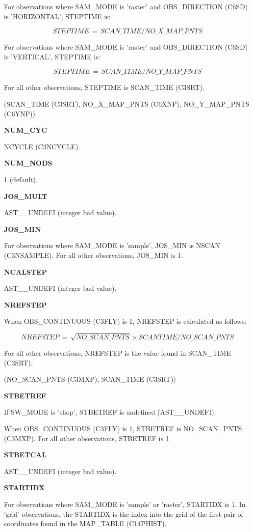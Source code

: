 \documentclass[twoside,11pt,nolof]{starlink}
\providecommand{\obsContinuous}{OBS\_CONTINUOUS (C3FLY)}
\providecommand{\nMapPtsX}{NO\_X\_MAP\_PNTS (C6XNP)}
\providecommand{\nMapPtsY}{NO\_Y\_MAP\_PNTS (C6YNP)}
\providecommand{\obsDirection}{OBS\_DIRECTION (C6SD)}
\providecommand{\nScan}{NSCAN (C3NSAMPLE)}
\providecommand{\scanTime}{SCAN\_TIME (C3SRT)}
\providecommand{\nScanPts}{NO\_SCAN\_PNTS (C3MXP)}
\providecommand{\nCycle}{NCYCLE (C3NCYCLE)}
\providecommand{\mapTable}{MAP\_TABLE (C14PHIST)}
\begin{document}
For observations where SAM\_MODE is 'raster' and \obsDirection{} is 'HORIZONTAL', STEPTIME is:

\begin{equation}
STEPTIME \,=\,SCAN\_TIME / NO\_X\_MAP\_PNTS
\end{equation}

For observations where SAM\_MODE is 'raster' and \obsDirection{} is 'VERTICAL', STEPTIME is:

\begin{equation}
STEPTIME \,=\, SCAN\_TIME / NO\_Y\_MAP\_PNTS
\end{equation}

For all other observations, STEPTIME is \scanTime{}.

(\scanTime, \nMapPtsX, \nMapPtsY)

\textbf{NUM\_CYC}

\nCycle.

\textbf{NUM\_NODS}

1 (default).

\textbf{JOS\_MULT}

AST\_\_UNDEFI (integer bad value).

\textbf{JOS\_MIN}

For observations where SAM\_MODE is 'sample', JOS\_MIN is \nScan.  For all other observations, JOS\_MIN is 1.

\textbf{NCALSTEP}

AST\_\_UNDEFI (integer bad value).

\textbf{NREFSTEP}

When \obsContinuous{} is 1, NREFSTEP is calculated as follows:

\begin{equation}
NREFSTEP \,=\, \sqrt{NO\_SCAN\_PNTS} \times SCANTIME / NO\_SCAN\_PNTS
\end{equation}

For all other observations, NREFSTEP is the value found in \scanTime.

(\nScanPts, \scanTime)

\textbf{STBETREF}

If SW\_MODE is 'chop', STBETREF is undefined (AST\_\_UNDEFI).

When \obsContinuous{} is 1, STBETREF is \nScanPts{}.  For all other observations, STBETREF is 1.

\textbf{STBETCAL}

AST\_\_UNDEFI (integer bad value).

\textbf{STARTIDX}

For observations where SAM\_MODE is 'sample' or 'raster', STARTIDX is 1.  In 'grid' observations, the STARTIDX is the index into the grid of the first pair of coordinates found in the \mapTable{}.
\end{document}
